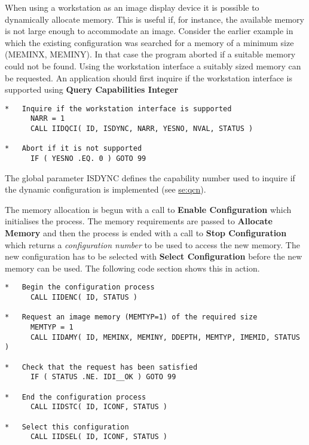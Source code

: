 When using a workstation as an image display device it is possible to
dynamically allocate memory. This is useful if, for instance, the
available memory is not large enough to accommodate an image. Consider
the earlier example in which the existing configuration was searched
for a memory of a minimum size (MEMINX, MEMINY). In that case the
program aborted if a suitable memory could not be found. Using the
workstation interface a suitably sized memory can be requested. An
application should first inquire if the workstation interface is
supported using {\bf Query Capabilities Integer}
\begin{small}
\begin{verbatim}
*   Inquire if the workstation interface is supported
      NARR = 1
      CALL IIDQCI( ID, ISDYNC, NARR, YESNO, NVAL, STATUS )

*   Abort if it is not supported
      IF ( YESNO .EQ. 0 ) GOTO 99
\end{verbatim}
\end{small}
The global parameter ISDYNC defines the capability number used to inquire
if the dynamic configuration is implemented (see 
\hyperref{this appendix}{appendix~}{}{se:qcn}).

The memory allocation is begun with a call to {\bf Enable Configuration}
which initialises the process. The memory requirements are passed to
{\bf Allocate Memory} and then the process is ended with a call to
{\bf Stop Configuration} which returns a {\it configuration number} to
be used to access the new memory. The new configuration has to be
selected with {\bf Select Configuration} before the new memory can
be used. The following code section shows this in action.
\begin{small}
\begin{verbatim}
*   Begin the configuration process
      CALL IIDENC( ID, STATUS )

*   Request an image memory (MEMTYP=1) of the required size
      MEMTYP = 1
      CALL IIDAMY( ID, MEMINX, MEMINY, DDEPTH, MEMTYP, IMEMID, STATUS )

*   Check that the request has been satisfied
      IF ( STATUS .NE. IDI__OK ) GOTO 99

*   End the configuration process
      CALL IIDSTC( ID, ICONF, STATUS )

*   Select this configuration
      CALL IIDSEL( ID, ICONF, STATUS )
\end{verbatim}
\end{small}

\newpage
